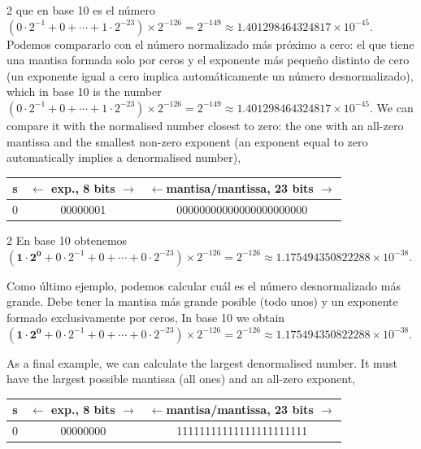 \begin{paracol}{2}
que en base 10 es el número $(0\cdot2^{-1}+0+\cdots+1\cdot2^{-23})\times 2^{-126}=2^{-149}\approx 1.401298464324817\times10^{-45}$. Podemos compararlo con el número normalizado más próximo a cero: el que tiene una mantisa formada solo por ceros y el exponente más pequeño distinto de cero (un exponente igual a cero implica automáticamente un número desnormalizado),
\switchcolumn
which in base 10 is the number $(0\cdot2^{-1}+0+\cdots+1\cdot2^{-23})\times 2^{-126}=2^{-149}\approx 1.401298464324817\times10^{-45}$. We can compare it with the normalised number closest to zero: the one with an all-zero mantissa and the smallest non-zero exponent (an exponent equal to zero automatically implies a denormalised number),
\end{paracol}

\begin{center}
\begin{tabular}{|c||c||c|}
\hline
s&$\leftarrow$ exp., 8 bits $\rightarrow$&$\leftarrow$mantisa/mantissa, 23 bits $\rightarrow$\\
\hline
0&00000001&00000000000000000000000\\
\hline
\end{tabular}
\end{center}

\begin{paracol}{2}
En base 10 obtenemos $(\mathbf{1\cdot2^0}+0\cdot2^{-1}+0+\cdots+0\cdot2^{-23})\times 2^{-126}=2^{-126}\approx   1.175494350822288\times10^{-38}$.

Como último ejemplo, podemos calcular cuál es el número desnormalizado más grande. Debe tener la mantisa más grande posible (todo unos) y un exponente formado exclusivamente por ceros,
\switchcolumn
In base 10 we obtain $(\mathbf{1\cdot2^0}+0\cdot2^{-1}+0+\cdots+0\cdot2^{-23})\times 2^{-126}=2^{-126}\approx   1.175494350822288\times10^{-38}$.

As a final example, we can calculate the largest denormalised number. It must have the largest possible mantissa (all ones) and an all-zero exponent,
\end{paracol}

\begin{center}
\begin{tabular}{|c||c||c|}
\hline
s&$\leftarrow$ exp., 8 bits $\rightarrow$&$\leftarrow$mantisa/mantissa, 23 bits $\rightarrow$\\
\hline
0&00000000&11111111111111111111111\\
\hline
\end{tabular}
\end{center}

